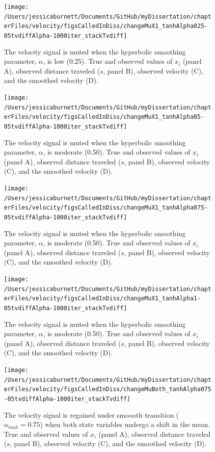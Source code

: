 \documentclass[12pt,twoside,openany]{reedthesis}
\begin{document}
\newpage
\begin{figure}
\texttt{[image: /Users/jessicaburnett/Documents/GitHub/myDissertation/chapterFiles/velocity/figsCalledInDiss/changeMuX1\_tanhAlpha025-05tvdiffAlpha-1000iter\_stackTvdiff]} \caption{The velocity signal is muted when the  hyperbolic smoothing parameter, $\alpha$, is low (0.25). True and observed values of $x_i$ (panel A), observed distance traveled ($s$, panel B), observed velocity (C), and the smoothed velocity (D). }\label{fig:mu1varpt25}
\end{figure}
\newpage
\begin{figure}
\texttt{[image: /Users/jessicaburnett/Documents/GitHub/myDissertation/chapterFiles/velocity/figsCalledInDiss/changeMuX1\_tanhAlpha05-05tvdiffAlpha-1000iter\_stackTvdiff]} \caption{The velocity signal is muted when the  hyperbolic smoothing parameter, $\alpha$, is moderate (0.50). True and observed values of $x_i$ (panel A), observed distance traveled ($s$, panel B), observed velocity (C), and the smoothed velocity (D). }\label{fig:mu1varpt5}
\end{figure}
\newpage
\begin{figure}
\texttt{[image: /Users/jessicaburnett/Documents/GitHub/myDissertation/chapterFiles/velocity/figsCalledInDiss/changeMuX1\_tanhAlpha075-05tvdiffAlpha-1000iter\_stackTvdiff]} \caption{The velocity signal is muted when the  hyperbolic smoothing parameter, $\alpha$, is moderate (0.50). True and observed values of $x_i$ (panel A), observed distance traveled ($s$, panel B), observed velocity (C), and the smoothed velocity (D). }\label{fig:mu1varpt75}
\end{figure}
\newpage
\begin{figure}
\texttt{[image: /Users/jessicaburnett/Documents/GitHub/myDissertation/chapterFiles/velocity/figsCalledInDiss/changeMuX1\_tanhAlpha1-05tvdiffAlpha-1000iter\_stackTvdiff]} \caption{The velocity signal is muted when the  hyperbolic smoothing parameter, $\alpha$, is moderate (0.50). True and observed values of $x_i$ (panel A), observed distance traveled ($s$, panel B), observed velocity (C), and the smoothed velocity (D). }\label{fig:mu1var1}
\end{figure}
\newpage
\begin{figure}
\texttt{[image: /Users/jessicaburnett/Documents/GitHub/myDissertation/chapterFiles/velocity/figsCalledInDiss/changeMuBoth\_tanhAlpha075-05tvdiffAlpha-1000iter\_stackTvdiff]} \caption{The velocity signal is regained under smoooth transition ($\alpha_{tanh}=0.75$) when both state variables undergo a shift in the mean. True and observed values of $x_i$ (panel A), observed distance traveled ($s$, panel B), observed velocity (C), and the smoothed velocity (D). }\label{fig:muBoth75}
\end{figure}
\end{document}
